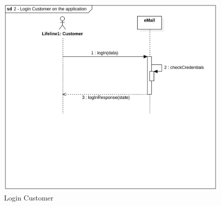 \begin{figure}[H]
    \begin{center}
        \includegraphics[width=\textwidth]{img/sequence/login-cust.png}
        \caption{Login Customer}
    \end{center}
\end{figure}
\newpage
